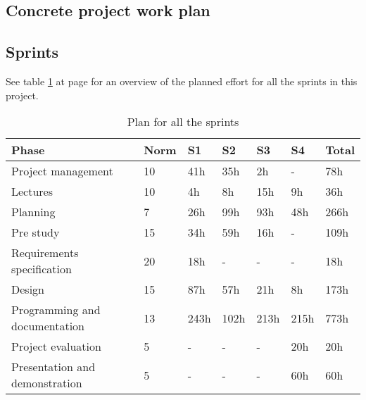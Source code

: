 

\subsection{Concrete project work plan}

\subsection*{Sprints}
See table \ref{tab:allsprints} at page \pageref{tab:allsprints} for an overview of the planned effort for all the sprints in this project.
\begin{table}[h!]
\begin{center}
\begin{tabular}{l|l|l|l|l|l|l} \hline
\textbf{Phase} &  \textbf{Norm} & \textbf{S1} & \textbf{S2}  & \textbf{S3} & \textbf{S4} & \textbf{Total} \\ \hline \hline
Project management & 10 & 41h & 35h & 2h & - & 78h\\
Lectures & 10 & 4h & 8h & 15h & 9h & 36h\\
Planning & 7 & 26h & 99h & 93h & 48h & 266h\\
Pre study & 15 & 34h & 59h & 16h & - & 109h\\
Requirements specification & 20 & 18h & - & - & - & 18h\\
Design & 15 & 87h & 57h & 21h & 8h & 173h\\
Programming and documentation & 13 & 243h & 102h & 213h & 215h & 773h\\
Project evaluation & 5 & - & - & - & 20h & 20h\\
Presentation and demonstration & 5 & - & - & - & 60h & 60h\\ \hline
\end{tabular}
\end{center}
\caption{Plan for all the sprints} \label{tab:allsprints}
\end{table}


